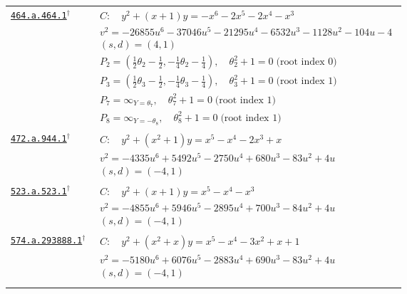 \documentclass[10pt]{article}
\newcommand{\entryseparator}{\noalign{\vskip3pt\hbox to\linewidth{\leaders\hbox{\kern2pt\rule{3pt}{0.3pt}\kern2pt}\hfill}\nobreak\vskip3pt\nobreak}}
\begin{document}
\begin{landscape}
\begin{longtable}{@{}p{3.4cm}p{\dimexpr\linewidth-3.4cm-2\tabcolsep\relax}@{}}
\href{https://www.lmfdb.org/Genus2Curve/Q/464/a/464/1}{\texttt{464.a.464.1}}$^{\dagger}$ & $\begin{gathered}C:\quad y^2+\left(x + 1\right)y=-x^{6} - 2 x^{5} - 2 x^{4} - x^{3}\\v^2=-26855 u^{6} - 37046 u^{5} - 21295 u^{4} - 6532 u^{3} - 1128 u^{2} - 104 u - 4\\(s,d)=(4,1)\\P_{2}=\left(\frac{1}{2} \theta_{2} - \frac{1}{2},-\frac{1}{4} \theta_{2} - \frac{1}{4}\right),\quad \theta_{2}^{2} + 1=0\;\text{(root index 0)}\\P_{3}=\left(\frac{1}{2} \theta_{3} - \frac{1}{2},-\frac{1}{4} \theta_{3} - \frac{1}{4}\right),\quad \theta_{3}^{2} + 1=0\;\text{(root index 1)}\\P_{7}=\infty_{Y=\theta_{7}},\quad \theta_{7}^{2} + 1=0\;\text{(root index 1)}\\P_{8}=\infty_{Y=-\theta_{8}},\quad \theta_{8}^{2} + 1=0\;\text{(root index 1)}\end{gathered}$ \\
\entryseparator
\href{https://www.lmfdb.org/Genus2Curve/Q/472/a/944/1}{\texttt{472.a.944.1}}$^{\dagger}$ & $\begin{gathered}C:\quad y^2+\left(x^{2} + 1\right)y=x^{5} - x^{4} - 2 x^{3} + x\\v^2=-4335 u^{6} + 5492 u^{5} - 2750 u^{4} + 680 u^{3} - 83 u^{2} + 4 u\\(s,d)=(-4,1)\end{gathered}$ \\
\entryseparator
\href{https://www.lmfdb.org/Genus2Curve/Q/523/a/523/1}{\texttt{523.a.523.1}}$^{\dagger}$ & $\begin{gathered}C:\quad y^2+\left(x + 1\right)y=x^{5} - x^{4} - x^{3}\\v^2=-4855 u^{6} + 5946 u^{5} - 2895 u^{4} + 700 u^{3} - 84 u^{2} + 4 u\\(s,d)=(-4,1)\end{gathered}$ \\
\entryseparator
\href{https://www.lmfdb.org/Genus2Curve/Q/574/a/293888/1}{\texttt{574.a.293888.1}}$^{\dagger}$ & $\begin{gathered}C:\quad y^2+\left(x^{2} + x\right)y=x^{5} - x^{4} - 3 x^{2} + x + 1\\v^2=-5180 u^{6} + 6076 u^{5} - 2883 u^{4} + 690 u^{3} - 83 u^{2} + 4 u\\(s,d)=(-4,1)\end{gathered}$ \\
\entryseparator

\end{longtable}
\end{landscape}
\end{document}
